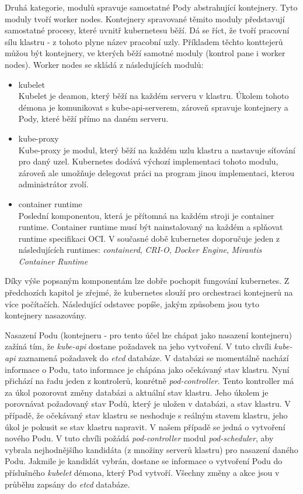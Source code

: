 Druhá kategorie, modulů spravuje samostatné Pody abstrahující kontejnery. Tyto moduly tvoří worker nodes. Kontejnery spravované těmito moduly představují samostatné procesy, které uvnitř kubernetesu běží. Dá se říct, že tvoří pracovní sílu klastru - z tohoto plyne název pracobní uzly. Příkladem těchto konttejerů můžou být kontejnery, ve kterých běží samotné moduly (kontrol pane i worker nodes).
Worker nodes se skládá z následujících modulů:
\begin{itemize}
    \item kubelet\\
    Kubelet je deamon, který běží na každém serveru v klastru. Úkolem tohoto démona je komunikovat s kube-api-serverem, zároveň spravuje kontejnery a Pody, které běží přímo na daném serveru. 
    \item kube-proxy\\
    Kube-proxy je modul, který běží na každém uzlu klastru a nastavuje síťování pro daný uzel. Kubernetes dodává výchozí implementaci tohoto modulu, zároveň ale umožňuje delegovat práci na program jinou implementaci, kterou administrátor zvolí. 
    \item container runtime\\
    Poslední komponentou, která je přítomná na každém stroji je container runtime. Container runtime musí být nainstalovaný na každém a splňovat runtime specifikaci OCI. V současné době kubernetes doporučuje jeden z následujících runtimes: \textit{containerd}, \textit{CRI-O}, \textit{Docker Engine}, \textit{Mirantis Container Runtime} \cite{thekubernetesauthors_2023_container} 
\end{itemize}

Díky výše popsaným komponentám lze dobře pochopit fungování kubernetes. Z předchozích kapitol je zřejmé, že kubernetes slouží pro orchestraci kontejnerů na více počítačích. Následující odstavec popíše, jakým způsobem jsou tyto kontejnery nasazovány.

Nasazení Podu (kontejneru - pro tento účel lze  chápat jako nasazení kontejneru) zažíná tím, že \textit{kube-api} dostane požadavek na jeho vytvoření. V tuto chvíli \textit{kube-api} zaznamená požadavek do \textit{etcd} databáze. V databázi se momentálně nachází informace o Podu, tato informace je chápána jako očekávaný stav klastru. Nyní přichází na řadu jeden z kontrolerů, konrétně \textit{pod-controller}. Tento kontroller má za úkol pozorovat změny databázi a aktuální stav klastru. Jeho úkolem je porovnávat požadovaný stav Podů, který je uložen v databázi, a stav klastru. V případě, že očekávaný stav klastru se neshoduje s reálným stavem klastru, jeho úkol je pokusit se stav klastru napravit. V našem případě se jedná o vytvoření nového Podu. V tuto chvíli požádá \textit{pod-controller} modul \textit{pod-scheduler}, aby vybrala nejhodnějšího kandidáta (z množiny serverů klastru) pro nasazení daného Podu. Jakmile je kandidát vybrán, dostane se informace o vytvoření Podu do příslušného \textit{kubelet} démona, který Pod vytvoří. Všechny změny a akce jsou v průběhu zapsány do \textit{etcd} databáze.  

